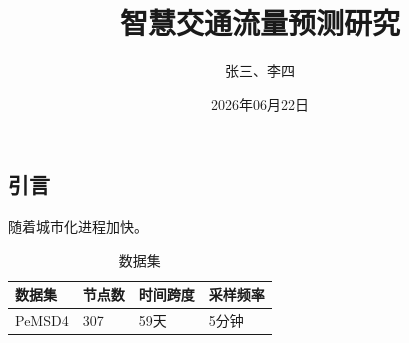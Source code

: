 \documentclass[twocolumn,dark,nomath]{harryopo-paper}
\title{智慧交通流量预测研究}
\author{张三、李四}
\date{2026年06月22日}
\begin{document}
\maketitlewithabstract
\subsection{引言}
随着城市化进程加快。
\begin{table}[htbp]
  \centering
  \caption{数据集}
  \begin{tabular}{llll}
    \toprule
    数据集 & 节点数 & 时间跨度 & 采样频率 \\
    \midrule
    PeMSD4 & 307 & 59天 & 5分钟 \\
    \bottomrule
  \end{tabular}
\end{table}
\end{document}
